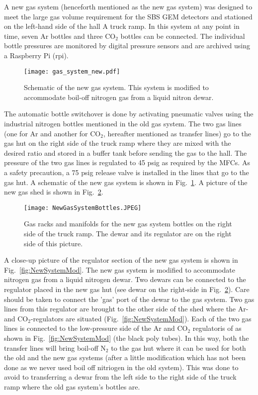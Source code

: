   A new gas system (henceforth mentioned as the new gas system) was designed to meet the large gas volume requirement for the SBS GEM detectors 
and stationed on the left-hand side of the hall A truck ramp. In this system at any point in time,
 seven Ar bottles and three CO$_2$ bottles can be connected. The individual bottle pressures are monitored by 
digital pressure sensors and are archived using a Raspberry Pi (rpi).
\begin{figure}[h!]
\begin{center}
\texttt{[image: gas\_system\_new.pdf]}
\caption{Schematic of the new gas system. This system is modified to accommodate boil-off nitrogen gas from a liquid nitron dewar.}
\label{fig:NewSystemSchematic}
\end{center}
\end{figure}
 The automatic bottle switchover is done by activating pneumatic valves using the industrial nitrogen bottles
 mentioned in the old gas system.
 The two gas lines (one for Ar and another for CO$_2$,  hereafter mentioned as transfer lines) go to the gas hut on the right side of the truck ramp where they are mixed with the desired ratio and 
stored in a buffer tank before sending the gas to the hall.
 The pressure of the two gas lines is regulated to 45 psig as required by the MFCs. 
As a safety precaution, a 75 psig release valve is installed in the lines that go to the gas hut.
 A schematic of the new gas system is shown in Fig.~\ref{fig:NewSystemSchematic}. A picture of the new gas shed is shown in Fig.~\ref{fig:NewSystemBottles}.
\begin{figure}[h!]
\begin{center}
\texttt{[image: NewGasSystemBottles.JPEG]}
\caption{Gas racks and manifolds for the new gas system bottles on the right side of the truck ramp. The dewar and its regulator are on the right side of this picture.}
\label{fig:NewSystemBottles}
\end{center}
\end{figure}

A close-up picture of the regulator section of the new gas system is shown in Fig.~\ref{fig:NewSystemMod}. 
The new gas system is modified to accommodate nitrogen gas from a liquid nitrogen dewar.
 Two dewars can be connected to the regulator placed in the new gas hut 
(see dewar on the right-side in Fig.~\ref{fig:NewSystemBottles}). Care should be taken to connect the 'gas' port of the dewar to the gas system.
 Two gas lines from this regulator are brought to the other side of the shed
 where the Ar- and CO$_2$-regulators are situated (Fig.~\ref{fig:NewSystemMod}). Each of the two gas lines is connected
 to the low-pressure side of the Ar and CO$_2$ regulatoris of as shown in Fig.~\ref{fig:NewSystemMod} (the black poly tubes). In this way, both the transfer lines will
 bring boil-off N$_2$ to the gas hut where it can be used for both the old and the new gas systems
 (after a little modification which has not been done as we never used boil off nitriogen in the old system).
 This was done to avoid to transferring a dewar from the left side to
 the right side of the truck ramp where the old gas system's bottles are. 

